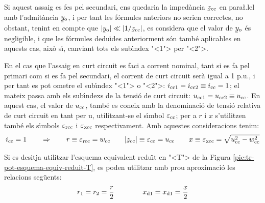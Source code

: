 Si aquest assaig es fes pel secundari, ens quedaria la imped\`{a}ncia
$\cmplx{z}\ped{cc}$ en para{\l.l}el amb l'admit\`{a}ncia
$\cmplx{y}\ped{o}$, i per tant les f\'{o}rmules anteriors no serien
correctes, no obstant, tenint en compte que $|\cmplx{y}\ped{o}| \ll
|1/\cmplx{z}\ped{cc}|$, es considera que el valor de
$\cmplx{y}\ped{o}$ \'{e}s negligible, i que les f\'{o}rmules dedu\"{\i}des
anteriorment s\'{o}n tamb\'{e} aplicables en aquests cas, aix\`{o} s\'{\i}, canviant
tots els sub\'{\i}ndex {"<}1{">} per {"<}2{">}.

En el cas que l'assaig en curt circuit es faci a corrent nominal,
tant  si es fa pel primari  com si es fa pel secundari, el corrent
de curt circuit ser\`{a} igual a 1 p.u., i per tant es pot ometre el
sub\'{\i}ndex {"<}1{">} o {"<}2{">}: $i_\mathrm{cc1} = i_\mathrm{cc2} \equiv i_\mathrm{cc} = 1$;
el mateix passa amb els sub\'{\i}ndexs de la tensi\'{o} de curt circuit:
$u_\mathrm{cc1} = u_\mathrm{cc2} \equiv u_\mathrm{cc}$. En aquest cas, el valor
de $u_\mathrm{cc}$, tamb\'{e} es coneix amb la denominaci\'{o} de
tensi\'{o} relativa de curt  circuit en tant per u, utilitzant-se  el
s\'{\i}mbol $\varepsilon_\mathrm{cc}$; per a $r$ i $x$ s'utilitzen tamb\'{e} els
s\'{\i}mbols $\varepsilon_\mathrm{rcc}$ i $\varepsilon_\mathrm{xcc}$
respectivament. Amb aquestes consideracions tenim:
\begin{equation}
    i\ped{cc} = 1 \qquad \Rightarrow \qquad r \equiv \varepsilon\ped{rcc} = w\ped{cc} \qquad
    |\cmplx{z}\ped{cc}| \equiv \varepsilon\ped{cc} = u\ped{cc} \qquad
    x \equiv \varepsilon\ped{xcc} = \sqrt{u\ped{cc}^2 - w\ped{cc}^2}
    \label{eq:assaig-cc-nomianl}
\end{equation}

Si es desitja utilitzar l'esquema equivalent redu\"{\i}t en {"<}T{">} de la Figura \vref{pic:tr-pot-esquema-equiv-reduit-T}, es poden utilitzar amb prou aproximaci\'{o} les relacions seg\"{u}ents:
\begin{equation}
    r_1 = r_2 = \frac{r}{2} \qquad\qquad x_\mathrm{d1} = x_\mathrm{d1} = \frac{x}{2}
\end{equation}


